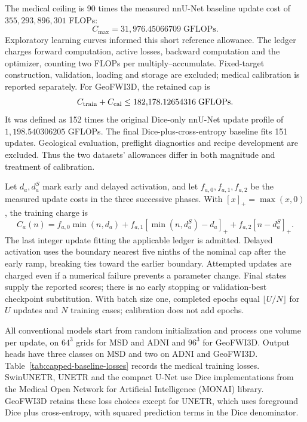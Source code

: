 \documentclass[12pt,a4paper]{article}
\begin{document}
The medical ceiling is 90 times the measured nnU-Net baseline update
cost of $355{,}293{,}896{,}301$ FLOPs:
\begin{equation}
C_{\max}=31{,}976.45066709\;\mathrm{GFLOPs}.
\label{eq:main-numerical-cap}
\end{equation}
Exploratory learning curves informed this short reference allowance.
The ledger charges forward computation, active losses, backward
computation and the optimizer, counting two FLOPs per
multiply--accumulate. Fixed-target construction, validation, loading
and storage are excluded; medical calibration is reported separately.
For GeoFWI3D, the retained cap is
\begin{equation}
C_{\rm train}+C_{\rm cal}\leq182{,}178.12654316\;\mathrm{GFLOPs}.
\label{eq:geological-compute-cap}
\end{equation}
It was defined as 152 times the original Dice-only nnU-Net update
profile of $1{,}198.540306205$ GFLOPs. The final Dice-plus-cross-entropy
baseline fits 151 updates. Geological evaluation, preflight diagnostics
and recipe development are excluded. Thus the two datasets' allowances
differ in both magnitude and treatment of calibration.

Let $d_a,d_a^S$ mark early and delayed activation, and let
$f_{a,0},f_{a,1},f_{a,2}$ be the measured update costs in the three
successive phases. With $[x]_+=\max(x,0)$, the training charge is
\begin{equation}
C_a(n)=f_{a,0}\min(n,d_a)
+f_{a,1}[\min(n,d_a^S)-d_a]_+
+f_{a,2}[n-d_a^S]_+.
\label{eq:piecewise-optimization-cost}
\end{equation}
The last integer update fitting the applicable ledger is admitted.
Delayed activation uses the boundary nearest five ninths of the
nominal cap after the early ramp, breaking ties toward the earlier
boundary. Attempted updates are charged even if a numerical failure
prevents a parameter change. Final states supply the reported scores;
there is no early stopping or validation-best checkpoint substitution.
With batch size one, completed epochs equal $\lfloor U/N\rfloor$
for $U$ updates and $N$ training cases; calibration does not add epochs.

All conventional models start from random initialization and process one
volume per update, on $64^3$ grids for MSD and ADNI and $96^3$ for GeoFWI3D.
Output heads have three classes on MSD and two on ADNI and GeoFWI3D.
Table~\ref{tab:capped-baseline-losses} records the medical training losses.
SwinUNETR, UNETR and the compact U-Net use Dice implementations from the
Medical Open Network for Artificial Intelligence (MONAI) library.
GeoFWI3D retains these loss choices except
for UNETR, which uses foreground Dice plus cross-entropy, with squared
prediction terms in the Dice denominator.
\end{document}
